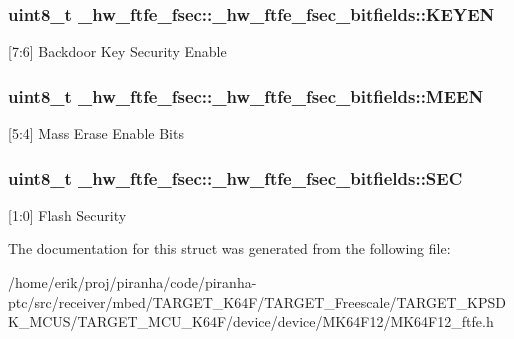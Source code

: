 \subsubsection[{\texorpdfstring{K\+E\+Y\+EN}{KEYEN}}]{\setlength{\rightskip}{0pt plus 5cm}uint8\+\_\+t \+\_\+hw\+\_\+ftfe\+\_\+fsec\+::\+\_\+hw\+\_\+ftfe\+\_\+fsec\+\_\+bitfields\+::\+K\+E\+Y\+EN}\hypertarget{struct__hw__ftfe__fsec_1_1__hw__ftfe__fsec__bitfields_ad4d38f27dbb333905bff4ee78ea8a4b3}{}\label{struct__hw__ftfe__fsec_1_1__hw__ftfe__fsec__bitfields_ad4d38f27dbb333905bff4ee78ea8a4b3}
\mbox{[}7\+:6\mbox{]} Backdoor Key Security Enable 
\subsubsection[{\texorpdfstring{M\+E\+EN}{MEEN}}]{\setlength{\rightskip}{0pt plus 5cm}uint8\+\_\+t \+\_\+hw\+\_\+ftfe\+\_\+fsec\+::\+\_\+hw\+\_\+ftfe\+\_\+fsec\+\_\+bitfields\+::\+M\+E\+EN}\hypertarget{struct__hw__ftfe__fsec_1_1__hw__ftfe__fsec__bitfields_a5998aeaa207e34467be791eaa99ff047}{}\label{struct__hw__ftfe__fsec_1_1__hw__ftfe__fsec__bitfields_a5998aeaa207e34467be791eaa99ff047}
\mbox{[}5\+:4\mbox{]} Mass Erase Enable Bits 
\subsubsection[{\texorpdfstring{S\+EC}{SEC}}]{\setlength{\rightskip}{0pt plus 5cm}uint8\+\_\+t \+\_\+hw\+\_\+ftfe\+\_\+fsec\+::\+\_\+hw\+\_\+ftfe\+\_\+fsec\+\_\+bitfields\+::\+S\+EC}\hypertarget{struct__hw__ftfe__fsec_1_1__hw__ftfe__fsec__bitfields_a19409c557e2977e71cb2ab7208cace59}{}\label{struct__hw__ftfe__fsec_1_1__hw__ftfe__fsec__bitfields_a19409c557e2977e71cb2ab7208cace59}
\mbox{[}1\+:0\mbox{]} Flash Security 

The documentation for this struct was generated from the following file\+:\begin{DoxyCompactItemize}
\item 
/home/erik/proj/piranha/code/piranha-\/ptc/src/receiver/mbed/\+T\+A\+R\+G\+E\+T\+\_\+\+K64\+F/\+T\+A\+R\+G\+E\+T\+\_\+\+Freescale/\+T\+A\+R\+G\+E\+T\+\_\+\+K\+P\+S\+D\+K\+\_\+\+M\+C\+U\+S/\+T\+A\+R\+G\+E\+T\+\_\+\+M\+C\+U\+\_\+\+K64\+F/device/device/\+M\+K64\+F12/M\+K64\+F12\+\_\+ftfe.\+h\end{DoxyCompactItemize}
